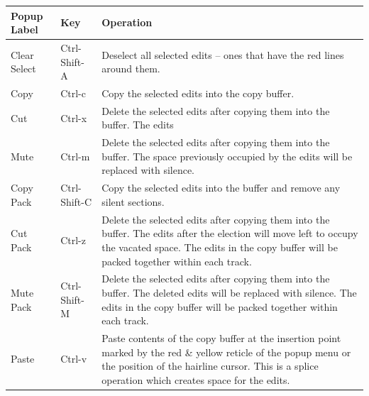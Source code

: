 \begin{center}
  \begin{longtable}{p{}
    p{} p{}
    }
    \toprule
    \textbf{Popup Label} & \textbf{Key} & \textbf{Operation}\\ \midrule
    \endhead
    Clear Select & Ctrl-Shift-A & Deselect all selected edits --
                                  ones that have the red lines
                                  around them.\\

    Copy & Ctrl-c & Copy the selected edits into the copy buffer.\\

    Cut & Ctrl-x & Delete the selected edits after copying them into
                   the buffer. The edits\\

    Mute & Ctrl-m & Delete the selected edits after copying them
                    into the buffer. The space previously occupied
                    by the edits will be replaced with silence.\\

    Copy Pack & Ctrl-Shift-C & Copy the selected edits into the
                               buffer and remove any silent
                               sections.\\

    Cut Pack & Ctrl-z & Delete the selected edits after copying them
                        into the buffer. The edits after the
                        election will move left to occupy the
                        vacated space.  The edits in the copy buffer
                        will be packed together within each track.\\

    Mute Pack & Ctrl-Shift-M & Delete the selected edits after
                               copying them into the buffer.  The
                               deleted edits will be replaced with
                               silence.  The edits in the copy
                               buffer will be packed together within
                               each track.\\

    Paste  & Ctrl-v & Paste contents of the copy buffer at the
                      insertion point marked by the red \& yellow
                      reticle of the popup menu or the position of
                      the hairline cursor. This is a splice
                      operation which creates space for the edits.\\


\end{longtable}
\end{center}

